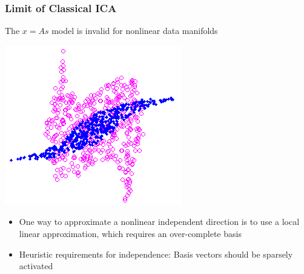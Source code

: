 \documentclass{beamer}
\begin{document}
\begin{frame}
\frametitle{Limit of Classical ICA} 
The $x=As$ model is invalid for nonlinear data manifolds
\begin{center}
\includegraphics[scale = 0.25]{nonlinear.png}
\end{center} 
\begin{itemize}
\item{One way to approximate a nonlinear independent direction is to use a local linear approximation, which requires an over-complete basis} 
\item{Heuristic requirements for independence: Basis vectors should be sparsely activated}
\end{itemize}
\end{frame} 
\end{document}
